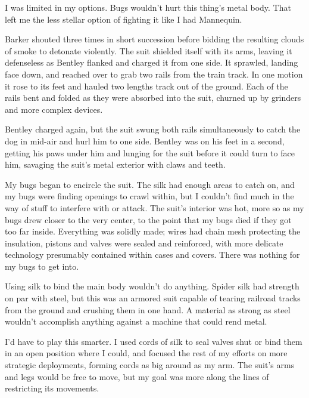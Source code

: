 I was limited in my options.  Bugs wouldn't hurt this thing's metal body.  That left me the less stellar option of fighting it like I had Mannequin.



Barker shouted three times in short succession before bidding the resulting clouds of smoke to detonate violently.  The suit shielded itself with its arms, leaving it defenseless as Bentley flanked and charged it from one side.  It sprawled, landing face down, and reached over to grab two rails from the train track.  In one motion it rose to its feet and hauled two lengths track out of the ground.  Each of the rails bent and folded as they were absorbed into the suit, churned up by grinders and more complex devices.



Bentley charged again, but the suit swung both rails simultaneously to catch the dog in mid-air and hurl him to one side.  Bentley was on his feet in a second, getting his paws under him and lunging for the suit before it could turn to face him, savaging the suit's metal exterior with claws and teeth.



My bugs began to encircle the suit.  The silk had enough areas to catch on, and my bugs were finding openings to crawl within, but I couldn't find much in the way of stuff to interfere with or attack.  The suit's interior was hot, more so as my bugs drew closer to the very center, to the point that my bugs died if they got too far inside.  Everything was solidly made; wires had chain mesh protecting the insulation, pistons and valves were sealed and reinforced, with more delicate technology presumably contained within cases and covers. There was nothing for my bugs to get into.



Using silk to bind the main body wouldn't do anything.  Spider silk had strength on par with steel, but this was an armored suit capable of tearing railroad tracks from the ground and crushing them in one hand.  A material as strong as steel wouldn't accomplish anything against a machine that could rend metal.



I'd have to play this smarter.  I used cords of silk to seal valves shut or bind them in an open position where I could, and focused the rest of my efforts on more strategic deployments, forming cords as big around as my arm.  The suit's arms and legs would be free to move, but my goal was more along the lines of restricting its movements.



